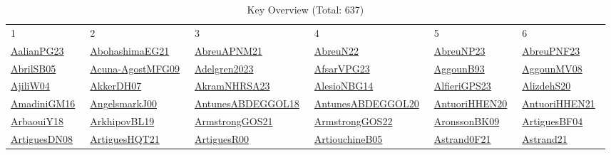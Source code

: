 \begin{longtable}{*{6}{l}}
\rowcolor{white}\caption{Key Overview (Total: 637)}\\ \toprule
\rowcolor{white}1 & 2 & 3 & 4 & 5 & 6\\ \midrule
\endhead
\bottomrule
\endfoot
\href{works/AalianPG23.pdf}{AalianPG23}~\cite{AalianPG23} & \href{works/AbohashimaEG21.pdf}{AbohashimaEG21}~\cite{AbohashimaEG21} & \href{works/AbreuAPNM21.pdf}{AbreuAPNM21}~\cite{AbreuAPNM21} & \href{works/AbreuN22.pdf}{AbreuN22}~\cite{AbreuN22} & \href{works/AbreuNP23.pdf}{AbreuNP23}~\cite{AbreuNP23} & \href{}{AbreuPNF23}~\cite{AbreuPNF23}\\ 
\href{works/AbrilSB05.pdf}{AbrilSB05}~\cite{AbrilSB05} & \href{works/Acuna-AgostMFG09.pdf}{Acuna-AgostMFG09}~\cite{Acuna-AgostMFG09} & \href{}{Adelgren2023}~\cite{Adelgren2023} & \href{}{AfsarVPG23}~\cite{AfsarVPG23} & \href{works/AggounB93.pdf}{AggounB93}~\cite{AggounB93} & \href{}{AggounMV08}~\cite{AggounMV08}\\ 
\href{}{AjiliW04}~\cite{AjiliW04} & \href{works/AkkerDH07.pdf}{AkkerDH07}~\cite{AkkerDH07} & \href{works/AkramNHRSA23.pdf}{AkramNHRSA23}~\cite{AkramNHRSA23} & \href{works/AlesioNBG14.pdf}{AlesioNBG14}~\cite{AlesioNBG14} & \href{works/AlfieriGPS23.pdf}{AlfieriGPS23}~\cite{AlfieriGPS23} & \href{}{AlizdehS20}~\cite{AlizdehS20}\\ 
\href{works/AmadiniGM16.pdf}{AmadiniGM16}~\cite{AmadiniGM16} & \href{works/AngelsmarkJ00.pdf}{AngelsmarkJ00}~\cite{AngelsmarkJ00} & \href{works/AntunesABDEGGOL18.pdf}{AntunesABDEGGOL18}~\cite{AntunesABDEGGOL18} & \href{works/AntunesABDEGGOL20.pdf}{AntunesABDEGGOL20}~\cite{AntunesABDEGGOL20} & \href{works/AntuoriHHEN20.pdf}{AntuoriHHEN20}~\cite{AntuoriHHEN20} & \href{works/AntuoriHHEN21.pdf}{AntuoriHHEN21}~\cite{AntuoriHHEN21}\\ 
\href{works/ArbaouiY18.pdf}{ArbaouiY18}~\cite{ArbaouiY18} & \href{}{ArkhipovBL19}~\cite{ArkhipovBL19} & \href{works/ArmstrongGOS21.pdf}{ArmstrongGOS21}~\cite{ArmstrongGOS21} & \href{works/ArmstrongGOS22.pdf}{ArmstrongGOS22}~\cite{ArmstrongGOS22} & \href{works/AronssonBK09.pdf}{AronssonBK09}~\cite{AronssonBK09} & \href{works/ArtiguesBF04.pdf}{ArtiguesBF04}~\cite{ArtiguesBF04}\\ 
\href{}{ArtiguesDN08}~\cite{ArtiguesDN08} & \href{}{ArtiguesHQT21}~\cite{ArtiguesHQT21} & \href{works/ArtiguesR00.pdf}{ArtiguesR00}~\cite{ArtiguesR00} & \href{works/ArtiouchineB05.pdf}{ArtiouchineB05}~\cite{ArtiouchineB05} & \href{works/Astrand0F21.pdf}{Astrand0F21}~\cite{Astrand0F21} & \href{works/Astrand21.pdf}{Astrand21}~\cite{Astrand21}\\ 

\end{longtable}
